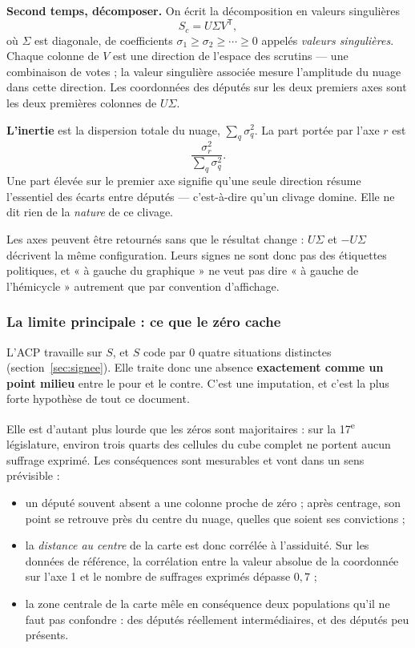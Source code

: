 \documentclass[11pt,a4paper]{article}
\begin{document}
\textbf{Second temps, décomposer.} On écrit la décomposition en valeurs
singulières
\[
 S_c=U\Sigma V^{\mathsf T},
\]
où $\Sigma$ est diagonale, de coefficients $\sigma_1\geq\sigma_2\geq\cdots\geq0$
appelés \emph{valeurs singulières}. Chaque colonne de $V$ est une direction de
l'espace des scrutins — une combinaison de votes ; la valeur singulière associée
mesure l'amplitude du nuage dans cette direction. Les coordonnées des députés
sur les deux premiers axes sont les deux premières colonnes de $U\Sigma$.

\textbf{L'inertie} est la dispersion totale du nuage, $\sum_q\sigma_q^2$. La
part portée par l'axe $r$ est
\[
 \frac{\sigma_r^2}{\sum_q\sigma_q^2}.
\]
Une part élevée sur le premier axe signifie qu'une seule direction résume
l'essentiel des écarts entre députés — c'est-à-dire qu'un clivage domine. Elle
ne dit rien de la \emph{nature} de ce clivage.

Les axes peuvent être retournés sans que le résultat change : $U\Sigma$ et
$-U\Sigma$ décrivent la même configuration. Leurs signes ne sont donc pas des
étiquettes politiques, et « à gauche du graphique » ne veut pas dire « à gauche
de l'hémicycle » autrement que par convention d'affichage.

\subsubsection*{La limite principale : ce que le zéro cache}

L'ACP travaille sur $S$, et $S$ code par $0$ quatre situations distinctes
(section~\ref{sec:signee}). Elle traite donc une absence \textbf{exactement
comme un point milieu} entre le pour et le contre. C'est une imputation, et
c'est la plus forte hypothèse de tout ce document.

Elle est d'autant plus lourde que les zéros sont majoritaires : sur la
17\textsuperscript{e} législature, environ trois quarts des cellules du cube
complet ne portent aucun suffrage exprimé. Les conséquences sont mesurables et
vont dans un sens prévisible :

\begin{itemize}
  \item un député souvent absent a une colonne proche de zéro ; après
  centrage, son point se retrouve près du centre du nuage, quelles que soient
  ses convictions ;
  \item la \emph{distance au centre} de la carte est donc corrélée à
  l'assiduité. Sur les données de référence, la corrélation entre la valeur
  absolue de la coordonnée sur l'axe 1 et le nombre de suffrages exprimés
  dépasse $0{,}7$ ;
  \item la zone centrale de la carte mêle en conséquence deux populations qu'il
  ne faut pas confondre : des députés réellement intermédiaires, et des députés
  peu présents.
\end{itemize}
\end{document}
